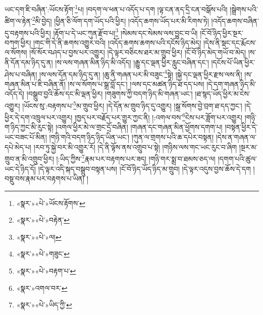 ཡང་དག་ཇི་བཞིན་:ཡོངས་རྟོག་\footnote{«སྣར་»«པེ་»ཡོངས་རྟོགས་}པ། །བདག་ལ་ཕན་པ་འདོད་པ་དག །ལྟ་ངན་ནད་དྲི་ངན་བསྒོས་པའི། །སྒྲེགས་པའི་ཚིག་ལ་རྟེན་\footnote{«སྣར་»«པེ་»བརྟེན་}མི་བྱེད། །ཕྱིན་ཅི་ལོག་དག་ཡོད་པའི་ཕྱིར། །འདོད་ཆགས་ཡོད་པར་མི་རིགས་ཏེ། །འདོད་ཆགས་བཞིན་དུ་བརྟགས་པའི་ཕྱིར། །རྟོག་པ་དེ་ཡང་ཀུན་རྫོབ་པ།\footnote{«སྣར་»«པེ་»ལ།} །སེམས་དང་སེམས་ལས་བྱུང་བ་ཡི། །ངོ་བོ་ཉིད་ཕྱིར་སྔར་བཀག་ཕྱིར། །གང་གི་དེ་ནི་ཆགས་འགྱུར་བའི། །འདོད་ཆགས་ཆགས་པའི་དངོས་ཉིད་མེད། །དེས་ནི་སྡང་དང་རྨོངས་ལ་སོགས། །སོ་སོར་བཤད་པ་བྱས་པར་འགྱུར། །དེ་ལྟར་བཅིངས་ཐར་མ་གྲུབ་ཕྱིར། །ངོ་བོ་ཉིད་མེད་གཡོ་བ་མེད། །ས་ནི་དོན་དམ་ཉིད་དུ་ན། །ས་ལས་གཞན་མིན་ཉིད་མི་འདོད། །རྒྱུ་དང་ལྡན་ཕྱིར་རླུང་བཞིན་དང་། །དངོས་པོ་ཡིན་ཕྱིར་ཤེས་པ་བཞིན། །ས་ལས་དོན་དམ་ཉིད་དུ་ན། །ཆུ་ནི་གཞན་པར་མི་བཟུང་\footnote{«སྣར་»«པེ་»གཟུང་}སྟེ། །སྐྱེ་དང་ལྡན་ཕྱིར་རྫས་ལས་ནི། །ས་གཞན་མིན་པ་ཇི་བཞིན་ནོ། །ས་ལ་སོགས་པ་སྒྲ་བློ་དང་། །ལས་དང་མཚན་ཉིད་ཐ་དད་པས། །དེ་དག་གཞན་ཉིད་མི་འདོད་དེ། །བསྒྲུབ་བྱའི་ཆོས་དང་མི་ལྡན་ཕྱིར། །གཟུགས་ཀྱི་བདག་ཉིད་མི་གཞན་ཡང་། །ཐ་སྙད་ཡོད་ཕྱིར་མ་ངེས་འགྱུར། །ཡོངས་སུ་:བརྟགས་པ་\footnote{«སྣར་»«པེ་»བརྟག་པ་}མ་གྲུབ་ཕྱིར། །དེ་དོན་མ་གྲུབ་ཉིད་དུ་འགྱུར། །སྒྲ་སོགས་བྱེ་བྲག་ཐ་དད་ཀྱང་། །དེ་ཕྱིར་དེ་དག་འཁྲུལ་པར་འགྱུར། །ཁྱད་པར་བརྗོད་པར་གྱུར་ཀྱང་ནི། །:འགལ་བས་\footnote{«སྣར་»འགལ་བར་}ངེས་པར་ཟློག་པར་འགྱུར། །གཉི་ག་ཉིད་ཀྱང་མི་རུང་སྟེ། །འགལ་ཕྱིར་མེ་ལ་གྲང་དྲོ་བཞིན། །གཞན་དང་གཞན་མིན་ཕྱོགས་དགག་པ། །བསྟན་ཕྱིར་དེ་ཡང་བཟང་པོ་མིན། །གཉི་གའི་བདག་ཉིད་ཉིད་ཡིན་ཡང་། །ཀུན་ལ་གྲགས་པའི་ཆ་དཔེར་བསྟན། །དེས་ན་གཞན་ལ་དཔེ་མེད་པ། །རབ་ཏུ་སྐྱེ་བར་མི་འགྱུར་རོ། །དེ་ནི་ལྟོས་ནས་འགྲུབ་པ་སྟེ། །གཉིས་ལས་གང་ཡང་རུང་བ་ཞིག །སྔར་མ་གྲུབ་ན་མི་འགྲུབ་ཕྱིར། །:ཡིད་ཀྱིས་\footnote{«སྣར་»«པེ་»ཡིད་ཀྱི་}རྣམ་པར་བརྟགས་པར་ཟད། །གཉི་གར་སྨྲ་བ་ཐམས་ཅད་ལ། །དགག་པའི་ཚུལ་ཡང་དེ་ཉིད་དོ། །དེ་ལྟར་འདི་སྐད་བསྒྲུབ་བསྟན་པས། །ངོ་བོ་ཉིད་ཡོད་ཉིད་མ་གྲུབ། །དེ་ལྟར་འདུས་བྱས་ཆོས་དེ་དག །བསྡུ་བས་རྣམ་པར་བརྟགས་པ་ཡིན། །
